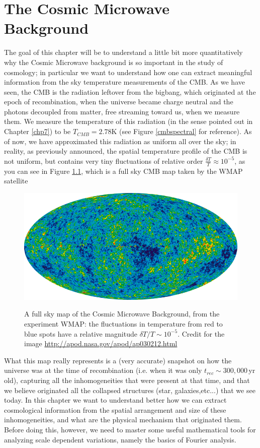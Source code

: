 \chapter{The Cosmic Microwave Background}
The goal of this chapter will be to understand a little bit more quantitatively why the Cosmic Microwave background is so important in the study of cosmology; in particular we want to understand how one can extract meaningful information from the sky temperature measurements of the CMB. As we have seen, the CMB is the radiation leftover from the bigbang, which originated at the epoch of recombination, when the universe became charge neutral and the photons decoupled from matter, free streaming toward us, when we measure them. We measure the temperature of this radiation (in the sense pointed out in Chapter \ref{chp7}) to be $T_{CMB}=2.78$K (see Figure \ref{cmbspectral} for reference). As of now, we have approximated this radiation as uniform all over the sky; in reality, as previously announced, the spatial temperature profile of the CMB is not uniform, but contains very tiny fluctuations of relative order $\frac{\delta T}{T}\approx 10^{-5}$, as you can see in Figure \ref{cmbwmap}, which is a full sky CMB 
map taken by the WMAP satellite 
\begin{figure}
\begin{center}
\includegraphics[scale=0.5]{CMB/wmap}
\label{}
\end{center}
\caption{A full sky map of the Cosmic Microwave Background, from the experiment WMAP: the fluctuations in temperature from red to blue spots have a relative magnitude $\delta T/T\sim 10^{-5}$.  Credit for the image \url{http://apod.nasa.gov/apod/ap030212.html}}
\label{cmbwmap}
\end{figure}
What this map really represents is a (very accurate) snapshot on how the universe was at the time of recombination (i.e. when it was only $t_{rec}\sim 300,000$\,yr old), capturing all the inhomogeneities that were present at that time, and that we believe originated all the collapsed structures (star, galaxies,etc...) that we see today. In this chapter we want to understand better how we can extract cosmological information from the spatial arrangement and size of these inhomogeneities, and what are the physical mechanism that originated them. Before doing this, however, we need to master some useful mathematical tools for analyzing scale dependent variations, namely the basics of Fourier analysis. 

